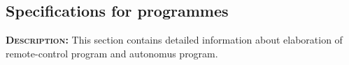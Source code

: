 \subsection{Specifications for programmes}
	\textsc{\textbf{Description:}} This section contains detailed information about elaboration of remote-control program and autonomus program.
	
	
	